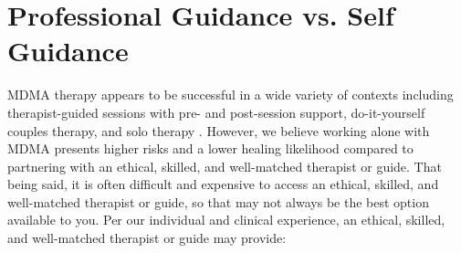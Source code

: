 \documentclass[12pt,letterpaper]{book}
\begin{document}
\section{Professional Guidance vs. Self Guidance}
\label{professionalVSSelf}
MDMA therapy appears to be successful in a wide variety of contexts including therapist-guided sessions with pre- and post-session support, do-it-yourself couples therapy, and solo therapy \cite{mitchellMDMAClinicalTrial2,colbertEvenings,hillsSolo}. However, we believe working alone with MDMA presents higher risks and a lower healing likelihood compared to partnering with an ethical, skilled, and well-matched therapist or guide. That being said, it is often difficult and expensive to access an ethical, skilled, and well-matched therapist or guide, so that may not always be the best option available to you. Per our individual and clinical experience, an ethical, skilled, and well-matched therapist or guide may provide:
\end{document}
